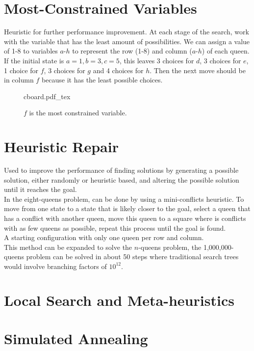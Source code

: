 \documentclass[a4paper]{article}
\newcommand{\incfig}[1]{%
	\def\svgwidth{\columnwidth}
	{#1.pdf_tex}
}
\begin{document}
	\section{Most-Constrained Variables}
	Heuristic for further performance improvement. At each stage of the search, work with the variable
	that has the least amount of possibilities. We can assign a value of 1-8 to variables  $a$-$h$ to
	represent the row (1-8) and column ($a$-$h$) of each queen. If the initial state is
	$a=1, b=3, c=5$, this leaves 3 choices for $d$, 3 choices for $e$, 1 choice for $f$, 3 choices for $g$
	and 4 choices for $h$. Then the next move should be in column  $f$ because it has the least possible
	choices.
	
	\begin{figure}[ht]
		\centering
		\incfig{cboard}
		\caption{$f$ is the most constrained variable.}
		\label{fig:cboard}
	\end{figure}	


	\section{Heuristic Repair}
	Used to improve the performance of finding solutions by generating a possible solution, either
	randomly or heuristic based, and altering the possible solution until it reaches the goal.\\
	In the eight-queens problem, can be done by using a mini-conflicts heuristic. To move from
	one state to a state that is likely closer to the goal, select a queen that has a conflict with 
	another queen, move this queen to a square where is conflicts with as few queens as possible, repeat
	this process until the goal is found.\\
	A starting configuration with only one queen per row and column.\\
	
	This method can be expanded to solve the $n$-queens problem, the 1,000,000-queens problem can be
	solved in about 50 steps where traditional search trees would involve branching factors of $10^{12}$.
	
	\section{Local Search and Meta-heuristics}
	
	\section{Simulated Annealing}
\end{document}
